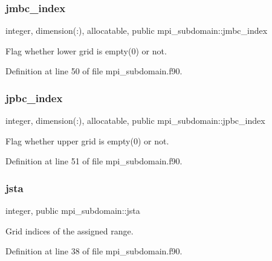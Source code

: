 \subsubsection{\texorpdfstring{jmbc\_index}{jmbc\_index}}
{\footnotesize\ttfamily integer, dimension(\+:), allocatable, public mpi\+\_\+subdomain\+::jmbc\+\_\+index}



Flag whether lower grid is empty(0) or not. 



Definition at line 50 of file mpi\+\_\+subdomain.\+f90.

\mbox{\label{namespacempi__subdomain_a9adbfdd11c7e9fdb968bb8eef2b13c2b}} 
\subsubsection{\texorpdfstring{jpbc\_index}{jpbc\_index}}
{\footnotesize\ttfamily integer, dimension(\+:), allocatable, public mpi\+\_\+subdomain\+::jpbc\+\_\+index}



Flag whether upper grid is empty(0) or not. 



Definition at line 51 of file mpi\+\_\+subdomain.\+f90.

\mbox{\label{namespacempi__subdomain_ac85bfba1caf77f9c3c0047fe9450fee6}} 
\subsubsection{\texorpdfstring{jsta}{jsta}}
{\footnotesize\ttfamily integer, public mpi\+\_\+subdomain\+::jsta}



Grid indices of the assigned range. 



Definition at line 38 of file mpi\+\_\+subdomain.\+f90.

\mbox{\label{namespacempi__subdomain_af9934313b1ccbcb09f30916df3326076}} 
